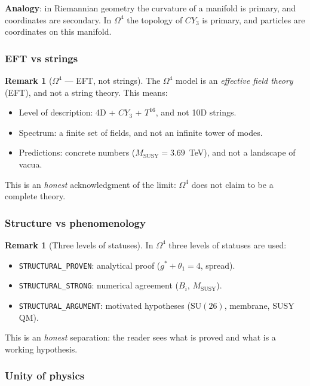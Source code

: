 \documentclass[11pt,a4paper]{article}
\newcommand{\SU}{\ensuremath{\mathrm{SU}}}
\newcommand{\CY}{\ensuremath{CY_3}}
\newcommand{\Om}{\ensuremath{\Omega^4}}
\theoremstyle{definition}
\newtheorem{remark}[theorem]{Remark}
\begin{document}
\medskip\noindent
\textbf{Analogy}: in Riemannian geometry the curvature of a manifold
is primary, and coordinates are secondary. In $\Om$ the topology of $\CY$
is primary, and particles are coordinates on this manifold.

\subsubsection{EFT vs strings}

\begin{remark}[$\Om$ --- EFT, not strings]
\label{rem:eft-not-strings}
The $\Om$ model is an \emph{effective field theory} (EFT),
and not a string theory. This means:
\begin{itemize}
    \item Level of description: 4D + $\CY$ + $T^{16}$, and not 10D strings.
    \item Spectrum: a finite set of fields, and not an infinite tower of modes.
    \item Predictions: concrete numbers ($M_{\text{SUSY}} = 3.69$~TeV),
          and not a landscape of vacua.
\end{itemize}
This is an \emph{honest} acknowledgment of the limit: $\Om$ does not claim
to be a complete theory.
\end{remark}

\subsubsection{Structure vs phenomenology}

\begin{remark}[Three levels of statuses]
\label{rem:three-levels}
In $\Om$ three levels of statuses are used:
\begin{itemize}
    \item \texttt{STRUCTURAL\_PROVEN}: analytical
          proof ($g^* + \theta_1 = 4$, spread).
    \item \texttt{STRUCTURAL\_STRONG}: numerical agreement
          ($B_i$, $M_{\text{SUSY}}$).
    \item \texttt{STRUCTURAL\_ARGUMENT}: motivated
          hypotheses ($\SU(26)$, membrane, SUSY QM).
\end{itemize}
This is an \emph{honest} separation: the reader sees what is proved
and what is a working hypothesis.
\end{remark}

\subsubsection{Unity of physics}
\end{document}
